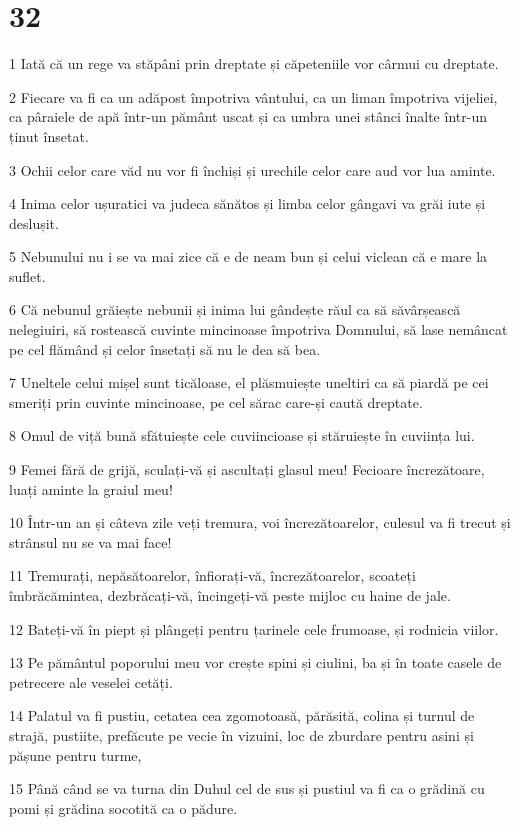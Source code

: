 \chapter{32}

\par 1 Iată că un rege va stăpâni prin dreptate și căpeteniile vor cârmui cu dreptate.
\par 2 Fiecare va fi ca un adăpost împotriva vântului, ca un liman împotriva vijeliei, ca pâraiele de apă într-un pământ uscat și ca umbra unei stânci înalte într-un ținut însetat.
\par 3 Ochii celor care văd nu vor fi închiși și urechile celor care aud vor lua aminte.
\par 4 Inima celor ușuratici va judeca sănătos și limba celor gângavi va grăi iute și deslușit.
\par 5 Nebunului nu i se va mai zice că e de neam bun și celui viclean că e mare la suflet.
\par 6 Că nebunul grăiește nebunii și inima lui gândește răul ca să săvârșească nelegiuiri, să rostească cuvinte mincinoase împotriva Domnului, să lase nemâncat pe cel flămând și celor însetați să nu le dea să bea.
\par 7 Uneltele celui mișel sunt ticăloase, el plăsmuiește uneltiri ca să piardă pe cei smeriți prin cuvinte mincinoase, pe cel sărac care-și caută dreptate.
\par 8 Omul de viță bună sfătuiește cele cuviincioase și stăruiește în cuviința lui.
\par 9 Femei fără de grijă, sculați-vă și ascultați glasul meu! Fecioare încrezătoare, luați aminte la graiul meu!
\par 10 Într-un an și câteva zile veți tremura, voi încrezătoarelor, culesul va fi trecut și strânsul nu se va mai face!
\par 11 Tremurați, nepăsătoarelor, înfiorați-vă, încrezătoarelor, scoateți îmbrăcămintea, dezbrăcați-vă, încingeți-vă peste mijloc cu haine de jale.
\par 12 Bateți-vă în piept și plângeți pentru țarinele cele frumoase, și rodnicia viilor.
\par 13 Pe pământul poporului meu vor crește spini și ciulini, ba și în toate casele de petrecere ale veselei cetăți.
\par 14 Palatul va fi pustiu, cetatea cea zgomotoasă, părăsită, colina și turnul de strajă, pustiite, prefăcute pe vecie în vizuini, loc de zburdare pentru asini și pășune pentru turme,
\par 15 Până când se va turna din Duhul cel de sus și pustiul va fi ca o grădină cu pomi și grădina socotită ca o pădure.
